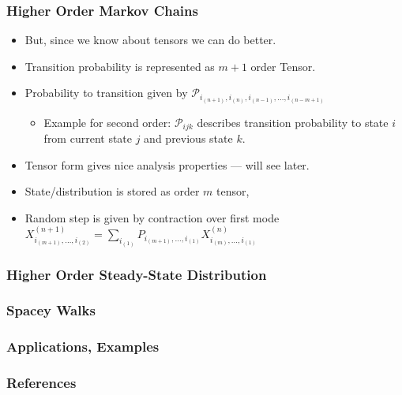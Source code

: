 \documentclass{beamer}
\begin{document}
\begin{frame}
\frametitle{Higher Order Markov Chains}
\begin{itemize}
\item But, since we know about tensors we can do better.
\item Transition probability is represented as $m+1$ order Tensor.
\item Probability to transition given by ${\mathcal P}_{i_{(n+1)},i_{(n)},i_{(n-1)},\ldots,i_{(n-m+1)}}$
\begin{itemize}
\item Example for second order: ${\mathcal P}_{ijk}$ describes transition probability to state $i$ from current state $j$ and previous state $k$.
\end{itemize}
\item Tensor form gives nice analysis properties --- will see later.
\item State/distribution is stored as order $m$ tensor, 
\item Random step is given by contraction over first mode $X_{i_{(m+1)},\ldots,i_{(2)}}^{(n+1)} = \sum_{i_{(1)}} P_{ i_{(m+1)}, \ldots, i_{(1)} } X_{ i_{(m)}, \ldots, i_{(1)} }^{(n)} $
\end{itemize}
	
\end{frame}

\begin{frame}
\frametitle{Higher Order Steady-State Distribution}
\end{frame}



\begin{frame}	
\frametitle{Spacey Walks}
\end{frame}



\begin{frame}
\frametitle{Applications, Examples}
\end{frame}

\begin{frame}
\frametitle{References}
\nocite*{}


\end{frame}
\end{document}
